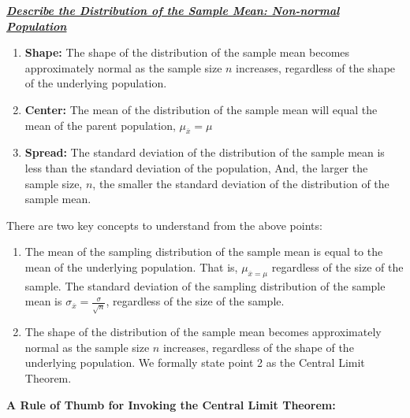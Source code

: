 \documentclass{report}
\begin{document}
     \pagebreak \bigbreak \noindent 
     \textbf{\textit{\underline{Describe the Distribution of the Sample Mean: Non-normal Population}}}
     \bigbreak \noindent 
     \begin{enumerate}
         \item \textbf{Shape:} The shape of the distribution of the sample mean becomes approximately normal as the sample size $n $ increases, regardless of the shape of the underlying population.
        \item \textbf{Center:} The mean of the distribution of the sample mean will equal the mean of the parent population, $\mu_{\overline{x}} = \mu$
        \item \textbf{Spread:} The standard deviation of the distribution of the sample mean is less than the standard deviation of the population, And, the larger the sample size, $n $, the smaller the standard deviation of the distribution of the sample mean.
     \end{enumerate}
     \bigbreak \noindent 
     There are two key concepts to understand from the above points:
     \begin{enumerate}
         \item The mean of the sampling distribution of the sample mean is equal to the mean of the underlying population. That is, $\mu_{\overline{x} = \mu} $ regardless of the size of the sample. The standard deviation of the sampling distribution of the sample mean is $\sigma_{\overline{x}} = \frac{\sigma}{\sqrt{n}} $, regardless of the size of the sample.
        \item The shape of the distribution of the sample mean becomes approximately normal as the sample size $n$ increases, regardless of the shape of the underlying population.
        \hspace{\parindent}  We formally state point 2 as the Central Limit Theorem.
     \end{enumerate}

     \bigbreak \noindent 
     \textbf{A Rule of Thumb for Invoking the Central Limit Theorem:}
     \bigbreak \noindent 
\end{document}
